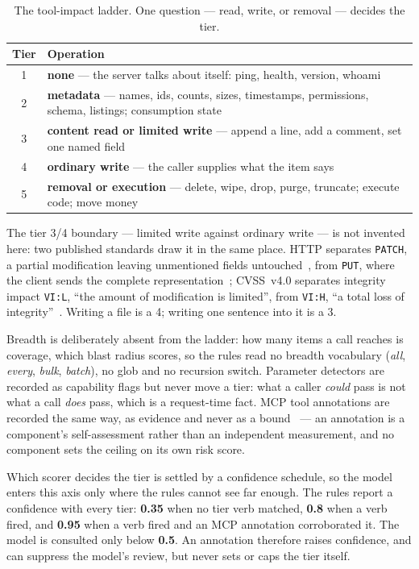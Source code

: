 \documentclass[sigconf]{acmart}
\begin{document}
\begin{table}[t]
\caption{The tool-impact ladder. One question --- read, write, or removal ---
decides the tier.}
\label{tab:ladder}
\small
\begin{tabular}{@{}cp{}@{}}
\toprule
Tier & Operation \\
\midrule
1 & \textbf{none} --- the server talks about itself: ping, health, version,
    whoami \\
2 & \textbf{metadata} --- names, ids, counts, sizes, timestamps, permissions,
    schema, listings; consumption state \\
3 & \textbf{content read or limited write} --- append a line, add a comment,
    set one named field \\
4 & \textbf{ordinary write} --- the caller supplies what the item says \\
5 & \textbf{removal or execution} --- delete, wipe, drop, purge, truncate;
    execute code; move money \\
\bottomrule
\end{tabular}
\end{table}

The tier 3/4 boundary --- limited write against ordinary write --- is not
invented here: two published standards draw it in the same place. HTTP
separates \texttt{PATCH}, a partial modification leaving unmentioned fields
untouched~\cite{dusseault2010patch}, from \texttt{PUT}, where the client sends
the complete representation~\cite{fielding2022http}; CVSS~v4.0 separates
integrity impact \texttt{VI:L}, ``the amount of modification is limited'', from
\texttt{VI:H}, ``a total loss of integrity''~\cite{first2023cvss4}. Writing a
file is a 4; writing one sentence into it is a 3.

Breadth is deliberately absent from the ladder: how many items a call reaches
is coverage, which blast radius scores, so the rules read no breadth vocabulary
(\emph{all}, \emph{every}, \emph{bulk}, \emph{batch}), no glob and no recursion
switch. Parameter detectors are recorded as capability
flags but never move a tier: what a caller \emph{could} pass is not what a call
\emph{does} pass, which is a request-time fact. MCP tool annotations are
recorded the same way, as evidence and never as a
bound~\cite{mcp2026spec} --- an annotation is a component's self-assessment
rather than an independent measurement, and no component sets the ceiling on
its own risk score.

Which scorer decides the tier is settled by a confidence schedule, so the model
enters this axis only where the rules cannot see far enough.
The rules report a confidence with every tier: \textbf{0.35} when no tier verb
matched, \textbf{0.8} when a verb fired, and \textbf{0.95} when a verb fired and
an MCP annotation corroborated it. The model is consulted only below
\textbf{0.5}. An annotation therefore raises confidence, and can suppress the
model's review, but never sets or caps the tier itself.
\end{document}
